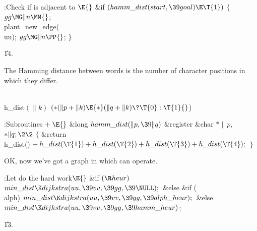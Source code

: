 \Y\B\4:Check if  is adjacent to \X${}\E{}$\6
\&{if} ${}(\\{hamm\_dist}(\\{start},\39\\{goal})\E\T{1}){}$\5
${}\{{}$\1\6
${}\\{gg}\MG\|n\MM{}$;\6
\\{plant\_new\_edge}(\\{uu});\6
${}\\{gg}\MG\|n\PP{}$;\6
\4${}\}{}$\2\par
\U14.\fi

The Hamming distance between words is the number of character positions
in which they differ.

\Y\B\4\D\\{h\_dist}$(\|k)$\5
$({*}(\|p+\|k)\E{*}(\|q+\|k)\?\T{0}:\T{1}{}$)\par
\Y\B\4:Subroutines\X${}\mathrel+\E{}$\6
\1\1\&{long} ${}\\{hamm\_dist}(\|p,\39\|q){}$\6
\&{register} \&{char} ${}{*}\|p,{}$ ${}{*}\|q;\2\2{}$\6
${}\{{}$\1\6
\&{return} \\{h\_dist}()${}+\\{h\_dist}(\T{1})+\\{h\_dist}(\T{2})+\\{h%
\_dist}(\T{3})+\\{h\_dist}(\T{4});{}$\6
\4${}\}{}$\2\par
\fi

OK, now we've got a graph in which  can operate.

\Y\B\4:Let  do the hard work\X${}\E{}$\6
\&{if} ${}(\R\\{heur}){}$\1\5
${}\\{min\_dist}\K\\{dijkstra}(\\{uu},\39\\{vv},\39\\{gg},\39\NULL);{}$\2\6
\&{else} \&{if} (\\{alph})\1\5
${}\\{min\_dist}\K\\{dijkstra}(\\{uu},\39\\{vv},\39\\{gg},\39\\{alph%
\_heur});{}$\2\6
\&{else}\1\5
${}\\{min\_dist}\K\\{dijkstra}(\\{uu},\39\\{vv},\39\\{gg},\39\\{hamm%
\_heur}){}$;\2\par
\U13.\fi

